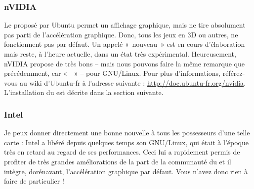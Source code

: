 \subsubsection{nVIDIA}
Le  proposé par Ubuntu permet un affichage graphique, mais ne tire absolument pas parti de l'accélération graphique. Donc, tous les jeux en 3D ou autres, ne fonctionnent pas par défaut. Un   appelé «~nouveau~» est en cours d'élaboration mais reste, à l'heure actuelle, dans un état très expérimental. Heureusement, nVIDIA propose de très bons   -- mais nous pouvons faire la même remarque que précédemment, car «~~» -- pour GNU/Linux. Pour plus d'informations, référez-vous au wiki d'Ubuntu-fr à l'adresse suivante : \url{http://doc.ubuntu-fr.org/nvidia}. L'installation du   est décrite dans la section suivante.
\subsubsection{Intel}
Je peux donner directement une bonne nouvelle à tous les possesseurs d'une telle carte : Intel a libéré depuis quelques temps son  GNU/Linux, qui était à l'époque très en retard au regard de ses performances. Ceci lui a rapidement permis de profiter de très grandes améliorations de la part de la communauté du  et il intègre, dorénavant, l'accélération graphique par défaut. Vous n'avez donc rien à faire de particulier !

